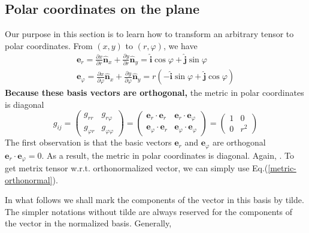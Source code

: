 \subsection{Polar coordinates on the plane}
Our purpose in this section is to learn how to transform an arbitrary tensor to polar coordinates. From $(x,y)$ to $(r,\varphi)$, we have
$$
\begin{array}{l}
{\mathbf{e}_{r}=\frac{\partial x}{\partial r} \hat{\mathbf{n}}_{x}+\frac{\partial y}{\partial r} \hat{\mathbf{n}}_{y}=\hat{\mathbf{i}} \cos \varphi+\hat{\mathbf{j}} \sin \varphi} \\
{\mathbf{e}_{\varphi}=\frac{\partial x}{\partial \varphi} \hat{\mathbf{n}}_{x}+\frac{\partial y}{\partial \varphi} \hat{\mathbf{n}}_{y}=r(-\hat{\mathbf{i}} \sin \varphi+\hat{\mathbf{j}} \cos \varphi)}
\end{array}
$$
\textbf{Because these basis vectors are orthogonal,} the metric in polar coordinates is diagonal
\begin{equation}
g_{i j}=\left(\begin{array}{ll}
{g_{r r}} & {g_{r \varphi}} \\
{g_{\varphi r}} & {g_{\varphi \varphi}}
\end{array}\right)=\left(\begin{array}{cc}
{\mathbf{e}_{r} \cdot \mathbf{e}_{r}} & {\mathbf{e}_{r} \cdot \mathbf{e}_{\varphi}} \\
{\mathbf{e}_{\varphi} \cdot \mathbf{e}_{r}} & {\mathbf{e}_{\varphi} \cdot \mathbf{e}_{\varphi}}
\end{array}\right)=\left(\begin{array}{cc}
{1} & {0} \\
{0} & {r^{2}}
\end{array}\right)
\end{equation}
The first observation is that the basic vectors $\mathbf{e}_{r}$ and $\mathbf{e}_{\varphi}$ are orthogonal $\mathbf{e}_{r} \cdot \mathbf{e}_{\varphi}=0 .$ As a result, the metric in polar coordinates is diagonal. Again, . To get metrix tensor w.r.t. orthonormalized vector, we can simply use Eq.(\ref{metric-orthonormal}).

In what follows we shall mark the components of the vector in this basis by tilde. The simpler notations without tilde are always reserved for the components of the vector in the normalized basis. Generally, 


